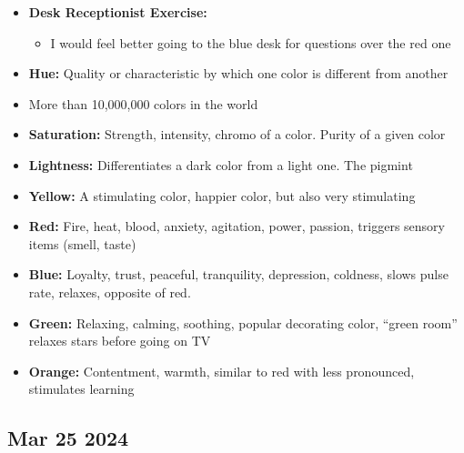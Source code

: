 \documentclass[12pt]{article}
\begin{document}
\begin{itemize}
		
		  \item \textbf{Desk Receptionist Exercise:}
				\begin{itemize}
					\item I would feel better going to the blue desk for questions over the red one
			 	\end{itemize}	
		  \item \textbf{Hue:} Quality or characteristic by which one color is different from another
		  \item More than 10,000,000 colors in the world
		  \item \textbf{Saturation:} Strength, intensity, chromo of a color. Purity of a given color
		  \item \textbf{Lightness:} Differentiates a dark color from a light one. The pigmint
		  \item \textbf{Yellow:} A stimulating color, happier color, but also very stimulating
		  \item \textbf{Red:} Fire, heat, blood, anxiety, agitation, power, passion, triggers sensory items (smell, taste)
		  \item \textbf{Blue:} Loyalty, trust, peaceful, tranquility, depression, coldness, slows pulse rate, relaxes, opposite of red.
		  \item \textbf{Green:} Relaxing, calming, soothing, popular decorating color, ``green room'' relaxes stars before going on TV
		  \item \textbf{Orange:} Contentment, warmth, similar to red with less pronounced, stimulates learning
\end{itemize}

\subsection*{Mar 25 2024}
\end{document}

